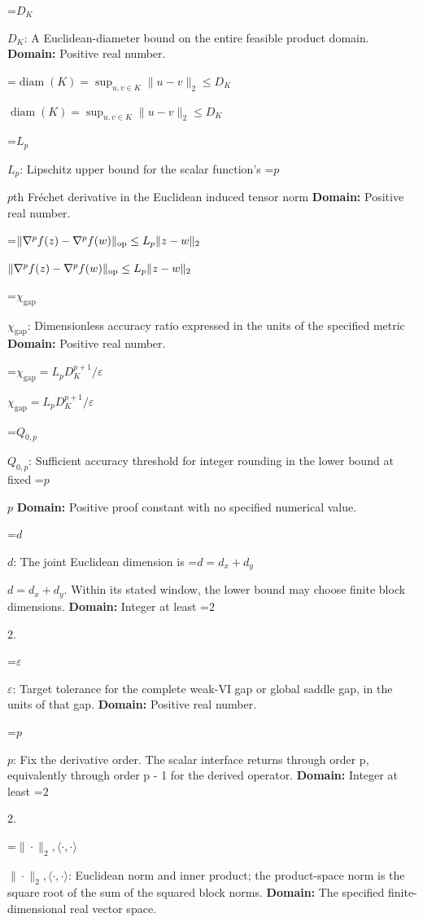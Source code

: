 \documentclass[10pt,a4paper]{article}
\newcommand{\AtlasMath}[1]{\par\begingroup\centering\setbox0=\hbox{$\displaystyle #1$}\ifdim\wd0>1.4\linewidth\typeout{ATLAS WIDE FORMULA: \the\wd0}\fi\ifdim\wd0>\linewidth\resizebox{\linewidth}{!}{\box0}\else\box0\fi\par\endgroup}
\newcommand{\AtlasInlineMath}[1]{\begingroup\setbox0=\hbox{$#1$}\ifdim\wd0>.4\linewidth\endgroup\AtlasMath{#1}\else\endgroup$#1$\fi}
\begin{document}
\AtlasInlineMath{D_K}: A Euclidean-diameter bound on the entire feasible product domain. \textbf{Domain:} Positive real number.



\AtlasInlineMath{\operatorname{diam}(K)=\sup_{u,v\in K}\|u-v\|_2\le D_K}



\AtlasInlineMath{L_p}: Lipschitz upper bound for the scalar function's \AtlasInlineMath{p}th Fréchet derivative in the Euclidean induced tensor norm \textbf{Domain:} Positive real number.



\AtlasInlineMath{\|\nabla^p f(z)-\nabla^p f(w)\|_{\rm op}\le L_p\|z-w\|_2}



\AtlasInlineMath{\chi_{\mathrm{gap}}}: Dimensionless accuracy ratio expressed in the units of the specified metric \textbf{Domain:} Positive real number.



\AtlasInlineMath{\chi_{\mathrm{gap}}=L_pD_K^{p+1}/\varepsilon}



\AtlasInlineMath{Q_{0,p}}: Sufficient accuracy threshold for integer rounding in the lower bound at fixed \AtlasInlineMath{p} \textbf{Domain:} Positive proof constant with no specified numerical value.



\AtlasInlineMath{d}: The joint Euclidean dimension is \AtlasInlineMath{d=d_x+d_y}. Within its stated window, the lower bound may choose finite block dimensions. \textbf{Domain:} Integer at least \AtlasInlineMath{2}.



\AtlasInlineMath{\varepsilon}: Target tolerance for the complete weak-VI gap or global saddle gap, in the units of that gap. \textbf{Domain:} Positive real number.



\AtlasInlineMath{p}: Fix the derivative order. The scalar interface returns through order p, equivalently through order p - 1 for the derived operator. \textbf{Domain:} Integer at least \AtlasInlineMath{2}.



\AtlasInlineMath{\|\cdot\|_2,\langle\cdot,\cdot\rangle}: Euclidean norm and inner product; the product-space norm is the square root of the sum of the squared block norms. \textbf{Domain:} The specified finite-dimensional real vector space.
\end{document}
